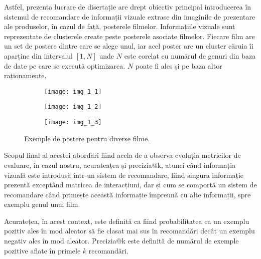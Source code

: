 Astfel, prezenta lucrare de disertație are drept obiectiv principal introducerea în sistemul de recomandare de informații vizuale extrase din imaginile de prezentare ale produselor, în cazul de față, posterele filmelor. Informațiile vizuale sunt reprezentate de clusterele create peste posterele asociate filmelor. Fiecare film are un set de postere dintre care se alege unul, iar acel poster are un cluster căruia îi aparține din intervalul $[1, N]$ unde $N$ este corelat cu numărul de genuri din baza de date pe care se execută optimizarea. $N$ poate fi ales și pe baza altor raționamente.

\begin{figure}[!htbp]
  \begin{subfigure}[b]{0.3\textwidth}
    \texttt{[image: img\_1\_1]}
  \end{subfigure}
  \hfill
  \begin{subfigure}[b]{0.3\textwidth}
    \texttt{[image: img\_1\_2]}
  \end{subfigure}
  \hfill
  \begin{subfigure}[b]{0.3\textwidth}
    \texttt{[image: img\_1\_3]}
  \end{subfigure}
  \caption[Exemple de postere]{Exemple de postere pentru diverse filme.}
\end{figure}

Scopul final al acestei abordări fiind acela de a observa evoluția metricilor de evaluare, în cazul nostru, acurateațea și precizia@k, atunci când informația vizuală este introdusă într-un sistem de recomandare, fiind singura informație prezentă exceptând matricea de interacțiuni, dar și cum se comportă un sistem de recomandare când primește această informație împreună cu alte informații, spre exemplu genul unui film.

Acuratețea, în acest context, este definită ca fiind probabilitatea ca un exemplu pozitiv ales în mod aleator să fie clasat mai sus în recomandări decât un exemplu negativ ales în mod aleator. Precizia@k este definită de numărul de exemple pozitive aflate în primele $k$ recomandări.

